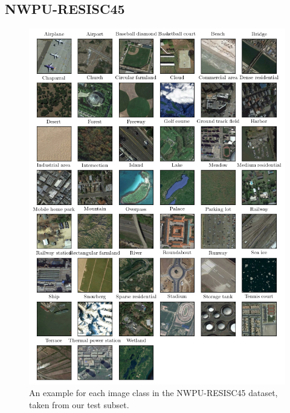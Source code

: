 \begin{appendices}
\section{NWPU-RESISC45}
\begin{figure}[H]
    \centering
    \includegraphics[width=\linewidth]{./assets/resisc45_all_classes.png}
    \caption{An example for each image class in the NWPU-RESISC45 dataset, taken from our test subset.}
\end{figure}
\end{appendices}
